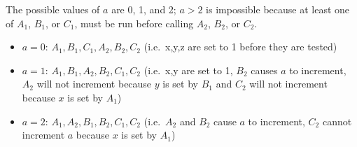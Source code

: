 The possible values of $a$ are 0, 1, and 2;
$a > 2$ is impossible because at least one of $A_1$, $B_1$, or $C_1$, must be run before calling $A_2$, $B_2$, or $C_2$.
\begin{itemize}
\item
$a = 0$: $A_1,B_1,C_1,A_2,B_2,C_2$ (i.e.\ x,y,z are set to 1 before they are tested)
\item
$a = 1$: $A_1,B_1,A_2,B_2,C_1,C_2$ (i.e.\ x,y are set to 1, $B_2$ causes $a$ to increment, $A_2$ will not increment because $y$ is set by $B_1$ and $C_2$ will not increment because $x$ is set by $A_1$)
\item
$a = 2$: $A_1,A_2,B_1,B_2,C_1,C_2$ (i.e.\ $A_2$ and $B_2$ cause $a$ to increment, $C_2$ cannot increment $a$ because $x$ is set by $A_1$)
\end{itemize}
